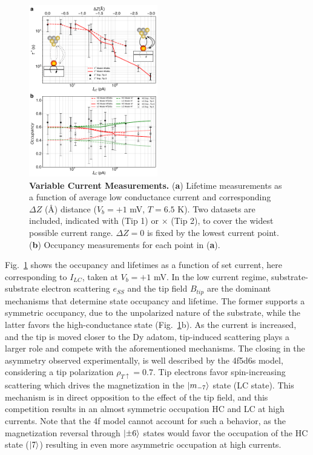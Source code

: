 \documentclass[
reprint,amsmath,amssymb,aps]{revtex4-2}
\begin{document}
\begin{figure}[h!]
\includegraphics[width=0.5\textwidth]{fig5_final_v3.pdf}
\caption{\textbf{Variable Current Measurements.} (\textbf{a}) Lifetime measurements as a function of average low conductance current and corresponding $\Delta Z$ (\AA) distance ($V_{b} = +1$ mV, $T = 6.5$ K). Two datasets are included, indicated with \textbullet \; (Tip 1) or $\times$ (Tip 2), to cover the widest possible current range. $\Delta Z = 0$ is fixed by the lowest current point. (\textbf{b}) Occupancy measurements for each point in (\textbf{a}). 
\label{fig:current} }
\end{figure}

Fig.~\ref{fig:current} shows the occupancy and lifetimes as a function of set current, here corresponding to $I_{LC}$, taken at $V_{b} = +1$ mV. In the low current regime, substrate-substrate electron scattering $e_{SS}$ and the tip field $B_{tip}$ are the dominant mechanisms that determine state occupancy and lifetime. The former supports a symmetric occupancy, due to the unpolarized nature of the substrate, while the latter favors the high-conductance state (Fig.~\ref{fig:current}b). As the current is increased, and the tip is moved closer to the Dy adatom, tip-induced scattering plays a larger role and compete with the aforementioned mechanisms. The closing in the asymmetry observed experimentally, is well described by the 4f5d6s model, considering a tip polarization $\rho_{T \uparrow} = 0.7$. Tip electrons favor spin-increasing scattering which drives the magnetization in the $\ket{m_{-7}}$ state (LC state). This mechanism is in direct opposition to the effect of the tip field, and this competition results in an almost symmetric occupation HC and LC at high currents. Note that the 4f model cannot account for such a behavior, as the magnetization reversal through $\ket{\pm 6}$ states would favor the occupation of the HC state ($\ket{7}$) resulting in even more asymmetric occupation at high currents.
\end{document}
